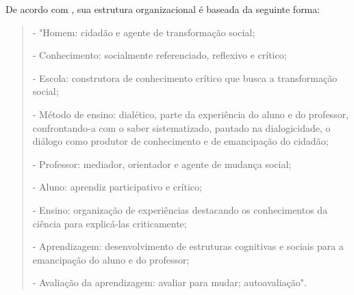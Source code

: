 De acordo com \cite{larchert}, sua estrutura organizacional é baseada da seguinte forma:
\begin{quote}- "Homem: cidadão e agente de transformação social;
	
- Conhecimento: socialmente referenciado, reflexivo e crítico;

- Escola: construtora de conhecimento crítico que busca a transformação social;

- Método de ensino: dialético, parte da experiência do aluno e do professor, confrontando-a com o saber sistematizado, pautado na dialogicidade, o diálogo como produtor de conhecimento e de emancipação do cidadão;

- Professor: mediador, orientador e agente de mudança social;

- Aluno: aprendiz participativo e crítico;

- Ensino: organização de experiências destacando os conhecimentos da ciência para explicá-las criticamente;

- Aprendizagem: desenvolvimento de estruturas cognitivas e sociais para a emancipação do aluno e do professor;

- Avaliação da aprendizagem: avaliar para mudar; autoavaliação".
\end{quote}
